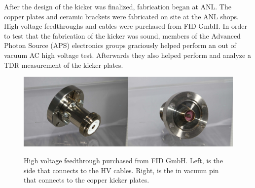 After the design of the kicker was finalized, fabrication began at ANL.
The copper plates and ceramic brackets were fabricated on site at the ANL shops.
High voltage feedthroughs and cables were purchased from FID GmbH. 
In order to test that the fabrication of the kicker was sound, members of the 
Advanced Photon Source (APS) electronics groups graciously helped perform an 
out of vacuum AC high voltage test. Afterwards they also helped perform and 
analyze a TDR measurement of the kicker plates.
\begin{figure}[h]
	\begin{center}
		\includegraphics[width=0.5\textwidth]{./images/FID_feedthrough1}\includegraphics[width=0.5\textwidth]{./images/FID_feedthrough2}
		\caption{High voltage feedthrough purchased from FID GmbH. Left, is the side that connects to the HV cables.
		Right, is the in vacuum pin that connects to the copper kicker plates.}
		\label{fig:feedthroughs}
	\end{center}
\end{figure}



